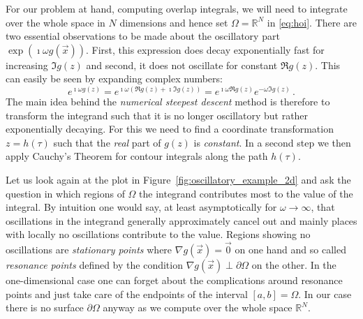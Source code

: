 \documentclass[a4paper,10pt]{article}
\begin{document}
For our problem at hand, computing overlap integrals, we will need to integrate
over the whole space in $N$ dimensions and hence set $\Omega = \mathbb{R}^N$ in
\eqref{eq:hoi}.
There are two essential observations to be made about the
oscillatory part $\exp\left(\imath \omega g\left(\vec{x}\right) \right)$.
First, this expression does decay exponentially
fast for increasing $\Im g(z)$ and second, it does not oscillate for
constant $\Re g(z)$. This can easily be seen by expanding complex numbers:
\begin{equation*}
  e^{\imath \omega g(z)}
  =
  e^{\imath \omega (\Re g(z) + \imath \Im g(z))}
  =
  e^{\imath \omega \Re g(z)}
  e^{- \omega \Im g(z)} \,.
\end{equation*}
The main idea behind the \emph{numerical steepest descent} method is therefore
to transform the integrand such that it is no longer oscillatory but
rather exponentially decaying. For this we need to find a coordinate
transformation $z = h(\tau)$ such that the \emph{real} part of $g(z)$
is \emph{constant}. In a second step we then apply Cauchy's Theorem for contour
integrals along the path $h(\tau)$.

Let us look again at the plot in Figure~\ref{fig:oscillatory_example_2d}
and ask the question in which regions of $\Omega$ the integrand contributes most
to the value of the integral. By intuition one would say, at least asymptotically
for $\omega \rightarrow \infty$, that oscillations in the integrand generally approximately
cancel out and mainly places with locally no oscillations contribute to the value.
Regions showing no oscillations are \emph{stationary points} where
$\nabla g(\vec{x}) = \vec{0}$ on one hand and so called \emph{resonance points}
defined by the condition $\nabla g(\vec{x}) \perp \partial \Omega$ on the other.
In the one-dimensional case one can forget about the complications around resonance
points and just take care of the endpoints of the interval $[a, b] = \Omega$. In our
case there is no surface $\partial \Omega$ anyway as we compute over the whole space
$\mathbb{R}^N$.
\end{document}
